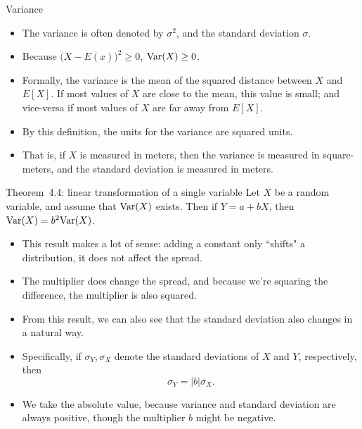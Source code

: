 \begin{frame}[allowframebreaks]{Variance}
  \begin{itemize}
    \item The variance is often denoted by $\sigma^2$, and the standard deviation $\sigma$.
    \item Because $\big(X - E(x)\big)^2 \geq 0$, $\mathrm{Var}(X) \geq 0$.
    \item Formally, the variance is the mean of the squared distance between $X$ and $E[X]$. If most values of $X$ are close to the mean, this value is small; and vice-versa if most values of $X$ are far away from $E[X]$.
    \item By this definition, the units for the variance are squared units. 
    \item That is, if $X$ is measured in meters, then the variance is measured in square-meters, and the standard deviation is measured in meters. 
  \end{itemize}
  
  \framebreak
  
  \begin{block}{Theorem~4.4: linear transformation of a single variable}
    Let $X$ be a random variable, and assume that $\mathrm{Var}(X)$ exists. Then if $Y = a + bX$, then $\mathrm{Var}(X) = b^2\mathrm{Var}(X)$.
    
  \end{block}
  
  
  \framebreak
  
  \begin{itemize}
    \item This result makes a lot of sense: adding a constant only ``shifts" a distribution, it does not affect the spread.
    \item The multiplier does change the spread, and because we're squaring the difference, the multiplier is also squared.
    \item From this result, we can also see that the standard deviation also changes in a natural way. 
    \item Specifically, if $\sigma_Y, \sigma_X$ denote the standard deviations of $X$ and $Y$, respectively, then
    $$
    \sigma_Y = |b|\sigma_X.
    $$
    \item We take the absolute value, because variance and standard deviation are always positive, though the multiplier $b$ might be negative.
  \end{itemize}
  

\end{frame}
